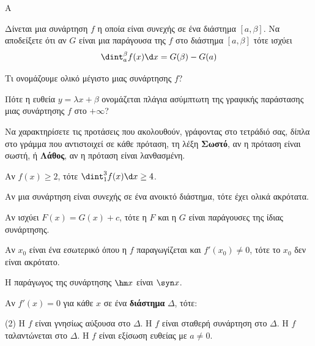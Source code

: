 \begin{thema}{A}
\begin{erwthma}
    \item Δίνεται μια συνάρτηση $ f $ η οποία είναι συνεχής σε ένα διάστημα $ [a,\beta] $. Να αποδείξετε ότι αν $ G $ είναι μια παράγουσα της $ f $ στο διάστημα $ [a,\beta] $ τότε ισχύει \[ \dint_{a}^{\beta}{f(x)}\d x=G(\beta)-G(a) \]
    \item Τι ονομάζουμε ολικό μέγιστο μιας συνάρτησης $f$?
    \item Πότε η ευθεία $y=\lambda x+\beta$ ονομάζεται πλάγια ασύμπτωτη της γραφικής παράστασης μιας συνάρτησης $f$ στο $+\infty$?
    \item Να χαρακτηρίσετε τις προτάσεις που ακολουθούν, γράφοντας στο τετράδιό σας, δίπλα στο γράμμα που αντιστοιχεί σε κάθε πρόταση, τη λέξη \textbf{Σωστό}, αν η πρόταση είναι σωστή, ή \textbf{Λάθος}, αν η πρόταση είναι λανθασμένη.
    \begin{alist}
        \item Αν $f(x) \ge 2$, τότε $\dint_1^3 f(x) \d x \ge 4$.
        \item Αν μια συνάρτηση είναι συνεχής σε ένα ανοικτό διάστημα, τότε έχει ολικά ακρότατα.
        \item Αν ισχύει $F(x) = G(x) + c$, τότε η $F$ και η $G$ είναι παράγουσες της ίδιας συνάρτησης.
        \item Αν $x_0$ είναι ένα εσωτερικό όπου η $f$ παραγωγίζεται και $f'(x_0) \ne 0$, τότε το $x_0$ δεν είναι ακρότατο.
        \item Η παράγωγος της συνάρτησης $\hm x$ είναι $\syn x$.
    \end{alist}
    \item Αν $f'(x) = 0$ για κάθε $x$ σε ένα \textbf{διάστημα} $\Delta$, τότε:
    \begin{tasks}[label=\let\textdexiakeraia\relax\alph*.](2)
        \task H $f$ είναι γνησίως αύξουσα στο $\Delta$.
        \task H $f$ είναι σταθερή συνάρτηση στο $\Delta$.
        \task H $f$ ταλαντώνεται στο $\Delta$.
        \task H $f$ είναι εξίσωση ευθείας με $a \ne 0$.
    \end{tasks}
\end{erwthma}
\end{thema}


